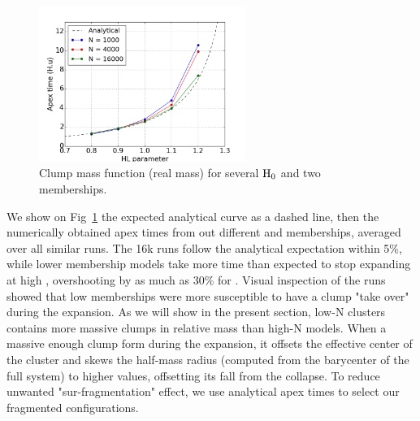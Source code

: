 \begin{figure}
\begin{center}
\includegraphics[width=0.6\textwidth]{Figures/2_apextime_NH.png}
\end{center}
\caption{Clump mass function (real mass) for several ${\textrm{H}}_0$  and two memberships.}
\label{Fig:2_apextime_NH}
\end{figure} 

We show on Fig~\ref{Fig:2_apextime_NH} the expected analytical curve as a dashed line, then the numerically obtained apex times from out different \tHub and memberships, averaged over all similar runs. The 16k runs follow the analytical expectation within 5\%, while lower membership models take more time than expected to stop expanding at high \tHub, overshooting by as much as 30\% for . Visual inspection of the runs showed that low memberships were more susceptible to have a clump "take over" during the expansion. As we will show in the present section, low-N clusters contains more massive clumps in relative mass than high-N models. When a massive enough clump form during the expansion, it offsets the effective center of the cluster and skews the half-mass radius (computed from the barycenter of the full system) to higher values, offsetting its fall from the collapse. To reduce unwanted "sur-fragmentation" effect, we use analytical apex times to select our fragmented configurations.  


